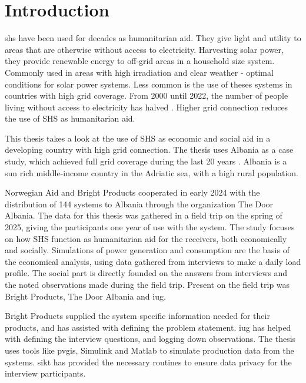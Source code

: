 
\chapter{Introduction}
\label{ch:intro}
\acrfull{shs} have been used for decades as humanitarian aid. They give light and utility to areas that are otherwise without access to electricity. Harvesting solar power, they provide renewable energy to off-grid areas in a household size system. Commonly used in areas with high irradiation and clear weather - optimal conditions for solar power systems. Less common is the use of theses systems in countries with high grid coverage. From 2000 until 2022, the number of people living without access to electricity has halved \citep{owid-energy-access}. Higher grid connection reduces the use of SHS as humanitarian aid.

This thesis takes a look at the use of SHS as economic and social aid in a developing country with high grid connection. The thesis uses Albania as a case study, which achieved full grid coverage during the last 20 years \citep{internationalrenewableenergyagencyTrackingSDG7Energy2023}. Albania is a sun rich middle-income country in the Adriatic sea, with a high rural population. 

Norwegian Aid and Bright Products cooperated in early 2024 with the distribution of 144 systems to Albania through the organization The Door Albania. The data for this thesis was gathered in a field trip on the spring of 2025, giving the participants one year of use with the system. The study focuses on how SHS function as humanitarian aid for the receivers, both economically and socially. Simulations of power generation and consumption are the basis of the economical analysis, using data gathered from interviews to make a daily load profile. The social part is directly founded on the answers from interviews and the noted observations made during the field trip. Present on the field trip was Bright Products, The Door Albania and \acrfull{iug}. 

Bright Products supplied the system specific information needed for their products, and has assisted with defining the problem statement. \acrshort{iug} has helped with defining the interview questions, and logging down observations. The thesis uses tools like \acrfull{pvgis}, Simulink and Matlab to simulate production data from the systems. \acrfull{sikt} has provided the necessary routines to ensure data privacy for the interview participants. 


